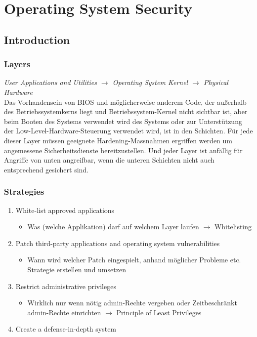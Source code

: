 

\section{Operating System Security}

\subsection{Introduction}

\subsubsection{Layers}
\textit{User Applications and Utilities $\rightarrow$ Operating System Kernel $\rightarrow$ Physical Hardware}\\

Das Vorhandensein von BIOS und möglicherweise anderem Code, der außerhalb des Betriebssystemkerns liegt und Betriebssystem-Kernel nicht sichtbar ist, aber beim Booten des Systems verwendet wird des Systems oder zur Unterstützung der Low-Level-Hardware-Steuerung verwendet wird, ist in den Schichten.
Für jede dieser Layer müssen geeignete Hardening-Massnahmen ergriffen werden um angemessene Sicherheitsdienste bereitzustellen. Und jeder Layer ist anfällig für Angriffe von unten angreifbar, wenn die unteren Schichten nicht auch entsprechend gesichert sind.

\subsubsection{Strategies}
\begin{enumerate}
    \item White-list approved applications
    \begin{itemize}
        \item Was (welche Applikation) darf auf welchem Layer laufen $\rightarrow$ Whitelisting
    \end{itemize}
    \item Patch third-party applications and operating system vulnerabilities
    \begin{itemize}
        \item Wann wird welcher Patch eingespielt, anhand möglicher Probleme etc. Strategie erstellen und umsetzen
    \end{itemize}
    \item Restrict administrative privileges
    \begin{itemize}
        \item Wirklich nur wenn nötig admin-Rechte vergeben oder Zeitbeschränkt admin-Rechte einrichten $\rightarrow$ Principle of Least Privileges
    \end{itemize}
    \item Create a defense-in-depth system
\end{enumerate}

